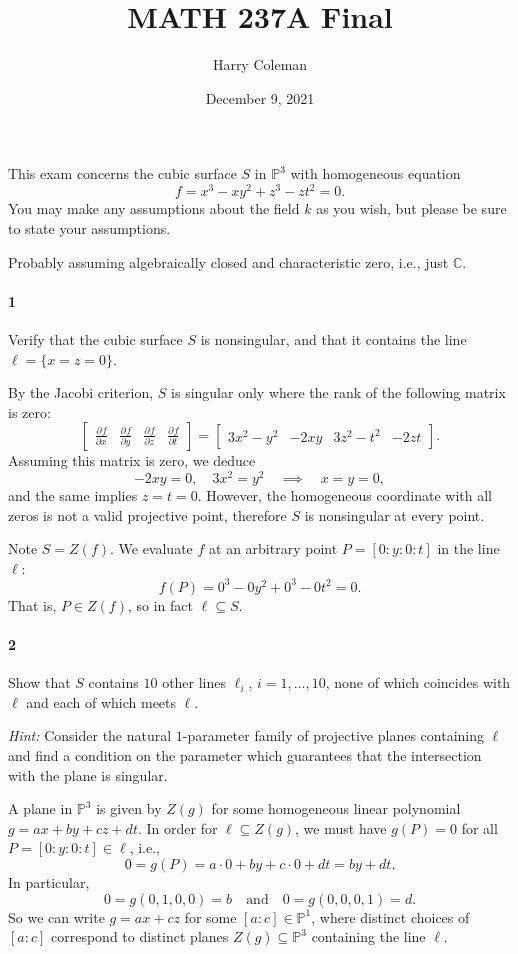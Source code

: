 \documentclass[12pt]{article}
\renewcommand{\maketitle}{\thispagestyle{title}}
\newlength{\myparskip}
\newenvironment{fullbox}{\begin{lrbox}{\savefullbox}\begin{minipage}{\dimexpr\textwidth-2\fboxsep\relax}\setlength{\parskip}{\myparskip}}{\end{minipage}\end{lrbox}\framebox[\textwidth]{\usebox{\savefullbox}}}
\newenvironment{pbox}[1][]{\begin{fullbox}\ifx#1\empty\else\paragraph{#1}\phantom{}\fi}{\end{fullbox}}
\theoremstyle{definition}
\newcommand{\isp}[1]{\quad\text{#1}\quad}
\newcommand{\C}{\mathbb{C}}
\renewcommand{\P}{\mathbb{P}}
\newcommand{\<}{\langle}
\renewcommand{\>}{\rangle}
\newcommand{\mat}[1]{\begin{bmatrix}#1\end{bmatrix}}
\newcommand{\pdv}[3][]{\frac{\partial^{#1}#2}{\partial{#3}^{#1}}}
\begin{document}
\title{MATH 237A Final}
\author{Harry Coleman}
\date{December 9, 2021}
\maketitle

\begin{pbox}
    This exam concerns the cubic surface $S$ in $\P^3$ with homogeneous equation
    \[
        f = x^3 - xy^2 + z^3 - zt^2 = 0.
    \]
    You may make any assumptions about the field $k$ as you wish, but please be sure to state your assumptions.
\end{pbox}

Probably assuming algebraically closed and characteristic zero, i.e., just $\C$.

\begin{pbox}[1]
    Verify that the cubic surface $S$ is nonsingular, and that it contains the line $\ell = \{x = z = 0\}$.
\end{pbox}

By the Jacobi criterion, $S$ is singular only where the rank of the following matrix is zero:
\[
    \mat{\pdv{f}{x} & \pdv{f}{y} & \pdv{f}{z} & \pdv{f}{t}}
        = \mat{3x^2 - y^2 & -2xy & 3z^2 - t^2 & -2zt}.
\]
Assuming this matrix is zero, we deduce
\[
    -2xy = 0, \quad 3x^2 = y^2 \quad\implies\quad x = y = 0,
\]
and the same implies $z = t = 0$.
However, the homogeneous coordinate with all zeros is not a valid projective point, therefore $S$ is nonsingular at every point.

Note $S = Z(f)$.
We evaluate $f$ at an arbitrary point $P = [0 : y : 0 : t]$ in the line $\ell$:
\[
    f(P) = 0^3 - 0y^2 + 0^3 - 0t^2 = 0.
\]
That is, $P \in Z(f)$, so in fact $\ell \subseteq S$.


\newpage
\begin{pbox}[2]
    Show that $S$ contains $10$ other lines $\ell_i$, $i = 1, \dots, 10$, none of which coincides with $\ell$ and each of which meets $\ell$.

    \textit{Hint:} Consider the natural $1$-parameter family of projective planes containing $\ell$ and find a condition on the parameter which guarantees that the intersection with the plane is singular. 
\end{pbox}

A plane in $\P^3$ is given by $Z(g)$ for some homogeneous linear polynomial $g = ax + by + cz + dt$.
In order for $\ell \subseteq Z(g)$, we must have $g(P) = 0$ for all $P = [0 : y : 0 : t] \in \ell$, i.e.,
\[
    0 = g(P) = a \cdot 0 + by + c \cdot 0 + dt = by + dt.
\]
In particular,
\[
    0 = g(0, 1, 0, 0) = b
    \isp{and}
    0 = g(0, 0, 0, 1) = d.
\]
So we can write $g = ax + cz$ for some $[a : c] \in \P^1$,
where distinct choices of $[a : c]$ correspond to distinct planes $Z(g) \subseteq \P^3$ containing the line $\ell$.
\end{document}
